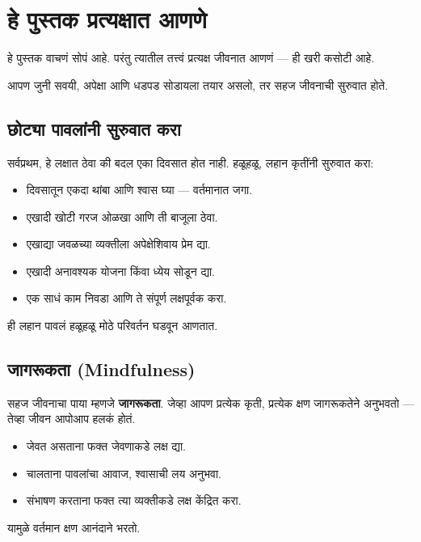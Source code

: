 \chapter{हे पुस्तक प्रत्यक्षात आणणे}

हे पुस्तक वाचणं सोपं आहे.  
परंतु त्यातील तत्त्वं प्रत्यक्ष जीवनात आणणं — ही खरी कसोटी आहे.  

आपण जुनी सवयी, अपेक्षा आणि धडपड सोडायला तयार असलो,  
तर सहज जीवनाची सुरुवात होते.  



\section*{छोट्या पावलांनी सुरुवात करा}

सर्वप्रथम, हे लक्षात ठेवा की बदल एका दिवसात होत नाही.  
हळूहळू, लहान कृतींनी सुरुवात करा:  

\begin{itemize}
  \item दिवसातून एकदा थांबा आणि श्वास घ्या — वर्तमानात जगा.  
  \item एखादी खोटी गरज ओळखा आणि ती बाजूला ठेवा.  
  \item एखाद्या जवळच्या व्यक्तीला अपेक्षेशिवाय प्रेम द्या.  
  \item एखादी अनावश्यक योजना किंवा ध्येय सोडून द्या.  
  \item एक साधं काम निवडा आणि ते संपूर्ण लक्षपूर्वक करा.  
\end{itemize}

ही लहान पावलं हळूहळू मोठे परिवर्तन घडवून आणतात.  



\section*{जागरूकता (Mindfulness)}

सहज जीवनाचा पाया म्हणजे \textbf{जागरूकता}.  
जेव्हा आपण प्रत्येक कृती, प्रत्येक क्षण जागरूकतेने अनुभवतो —  
तेव्हा जीवन आपोआप हलकं होतं.  

\begin{itemize}
  \item जेवत असताना फक्त जेवणाकडे लक्ष द्या.  
  \item चालताना पावलांचा आवाज, श्वासाची लय अनुभवा.  
  \item संभाषण करताना फक्त त्या व्यक्तीकडे लक्ष केंद्रित करा.  
\end{itemize}

यामुळे वर्तमान क्षण आनंदाने भरतो.  



